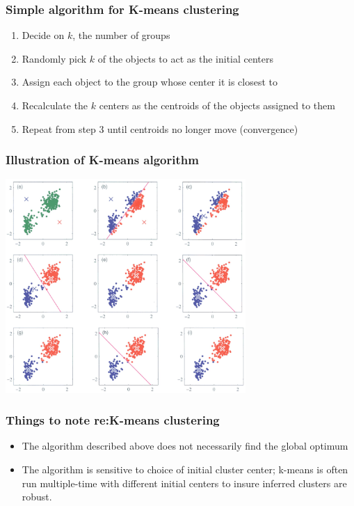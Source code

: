 \documentclass{beamer}
\begin{document}
\begin{frame}
\frametitle{Simple algorithm for K-means clustering}
\begin{enumerate}
\item Decide on $k$, the number of groups

\item Randomly pick $k$ of the objects to act as the initial centers

\item Assign each object to the group whose center it is closest to

\item Recalculate the $k$ centers as the centroids of the objects assigned to them

\item Repeat from step 3 until centroids no longer move (convergence)

\end{enumerate}
\end{frame}

\begin{frame}
\frametitle{Illustration of K-means algorithm}
\begin{center}
\includegraphics[height=3.2in]{k-means-fig.jpg}    
\end{center}
\end{frame}

\begin{frame}
\frametitle{Things to note re:K-means clustering}
\begin{itemize}
\item The algorithm described above does not necessarily find the global optimum

\bigskip

\item The algorithm is sensitive to choice of initial cluster center; k-means is often run multiple-time with different initial centers to insure inferred clusters are robust.    
\end{itemize}
\end{frame}
\end{document}
